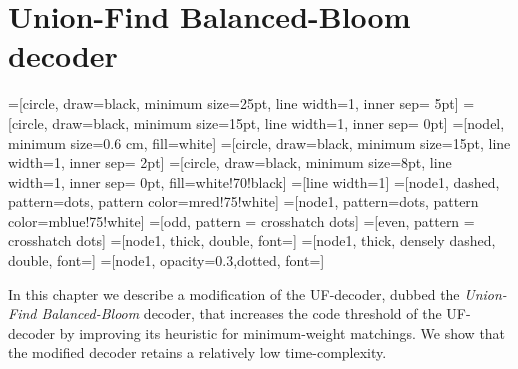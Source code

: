 \chapter{Union-Find Balanced-Bloom decoder}\label{ch:ufbb}

=[circle, draw=black, minimum size=25pt, line width=1, inner sep= 5pt]
=[circle, draw=black, minimum size=15pt, line width=1, inner sep= 0pt]
=[nodel, minimum size=0.6 cm, fill=white]
=[circle, draw=black, minimum size=15pt, line width=1, inner sep= 2pt]
=[circle, draw=black, minimum size=8pt, line width=1, inner sep= 0pt, fill=white!70!black]
=[line width=1]
\tikzfading[name=fade right, left color=transparent!0, right color=transparent!100]
=[node1, dashed, pattern=dots, pattern color=mred!75!white]
=[node1, pattern=dots, pattern color=mblue!75!white]
=[odd, pattern = crosshatch dots]
=[even, pattern = crosshatch dots]
=[node1, thick, double, font=\footnotesize]
=[node1, thick, densely dashed, double, font=\footnotesize]
=[node1, opacity=0.3,dotted, font=\footnotesize]


In this chapter we describe a modification of the UF-decoder, dubbed the \emph{Union-Find Balanced-Bloom} decoder, that increases the code threshold of the UF-decoder by improving its heuristic for minimum-weight matchings. We show that the modified decoder retains a relatively low time-complexity. 

